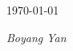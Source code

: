 \documentclass[]{friggeri-cv}
\begin{document}
\begin{flushleft}
  \today
\end{flushleft}
\begin{flushright}
\emph{Boyang Yan}
\end{flushright}

% 
\end{document}
